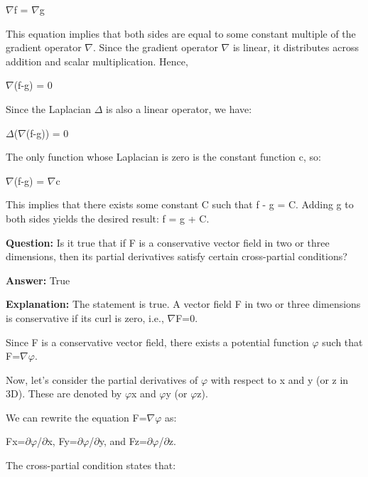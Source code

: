 \documentclass{article}
\begin{document}
\ensuremath{\nabla}f = \ensuremath{\nabla}g

This equation implies that both sides are equal to some constant multiple of the gradient operator \ensuremath{\nabla}. Since the gradient operator \ensuremath{\nabla} is linear, it distributes across addition and scalar multiplication. Hence,

\ensuremath{\nabla}(f-g) = 0

Since the Laplacian \ensuremath{\Delta} is also a linear operator, we have:

\ensuremath{\Delta}(\ensuremath{\nabla}(f-g)) = 0

The only function whose Laplacian is zero is the constant function c, so:

\ensuremath{\nabla}(f-g) = \ensuremath{\nabla}c

This implies that there exists some constant C such that f - g = C. Adding g to both sides yields the desired result: f = g + C.
                
                \vspace{0.5cm} 
        
            
                \textbf {Question:} Is it true that if F is a conservative vector field in two or three dimensions, then its partial derivatives satisfy certain cross-partial conditions?
                
                \textbf{Answer:} True

                \textbf{Explanation:} The statement is true. A vector field F in two or three dimensions is conservative if its curl is zero, i.e., \ensuremath{\nabla}{\texttimes}F=0.

Since F is a conservative vector field, there exists a potential function \ensuremath{\varphi} such that F=\ensuremath{\nabla}\ensuremath{\varphi}.

Now, let's consider the partial derivatives of \ensuremath{\varphi} with respect to x and y (or z in 3D). These are denoted by \ensuremath{\varphi}x and \ensuremath{\varphi}y (or \ensuremath{\varphi}z).

We can rewrite the equation F=\ensuremath{\nabla}\ensuremath{\varphi} as:

Fx=\ensuremath{\partial}\ensuremath{\varphi}/\ensuremath{\partial}x, Fy=\ensuremath{\partial}\ensuremath{\varphi}/\ensuremath{\partial}y, and Fz=\ensuremath{\partial}\ensuremath{\varphi}/\ensuremath{\partial}z.

The cross-partial condition states that:
\end{document}
